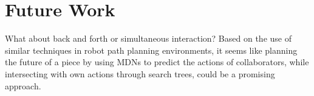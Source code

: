 \chapter{Future Work}\label{chap:futureWork}

What about back and forth or simultaneous interaction? Based on the use of similar techniques in robot path planning environments, it seems like planning the future of a piece by using MDNs to predict the actions of collaborators, while intersecting with own actions through search trees, could be a promising approach.